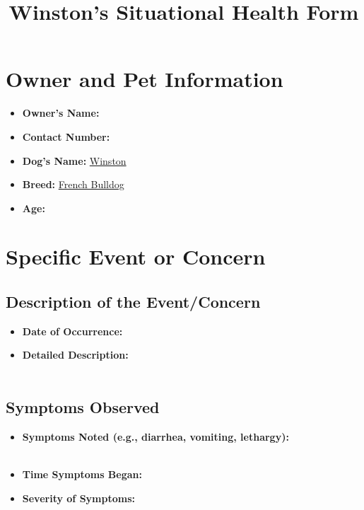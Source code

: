 \documentclass{article}
\title{Winston's Situational Health Form}
\date{}
\begin{document}
\maketitle

\section*{Owner and Pet Information}
\begin{itemize}
    \item \textbf{Owner's Name:} \underline{\hspace{6cm}}
    \item \textbf{Contact Number:} \underline{\hspace{6cm}}
    \item \textbf{Dog's Name:} \underline{Winston\hspace{4.5cm}}
    \item \textbf{Breed:} \underline{French Bulldog\hspace{3.85cm}}
    \item \textbf{Age:} \underline{\hspace{5.8cm}}
\end{itemize}

\section*{Specific Event or Concern}
\subsection*{Description of the Event/Concern}
\begin{itemize}
    \item \textbf{Date of Occurrence:} \underline{\hspace{6cm}}
    \item \textbf{Detailed Description:} \\
    \underline{\hspace{\textwidth}} \\
    \underline{\hspace{\textwidth}}
\end{itemize}

\subsection*{Symptoms Observed}
\begin{itemize}
    \item \textbf{Symptoms Noted (e.g., diarrhea, vomiting, lethargy):} \\
    \underline{\hspace{\textwidth}} \\
    \underline{\hspace{\textwidth}}
    \item \textbf{Time Symptoms Began:} \underline{\hspace{6cm}}
    \item \textbf{Severity of Symptoms:} \underline{\hspace{6cm}}
\end{itemize}
\end{document}
